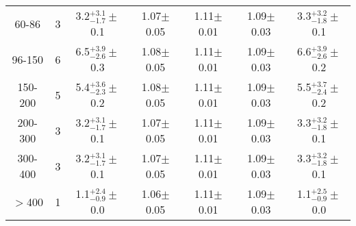 \begin{table}[ht!]
\begin{tabular}{ c  c  c  c  c  c c}
60-86    & 3    & 3.2$^{+3.1}_{-1.7}\pm$0.1  &  1.07$\pm$0.05 & 1.11$\pm$0.01& 1.09$\pm$0.03 & 3.3$^{+3.2}_{-1.8}\pm$0.1 \\
96-150   & 6    & 6.5$^{+3.9}_{-2.6}\pm$0.3  &  1.08$\pm$0.05 & 1.11$\pm$0.01& 1.09$\pm$0.03 & 6.6$^{+3.9}_{-2.6}\pm$0.2 \\
150-200  & 5    & 5.4$^{+3.6}_{-2.3}\pm$0.2  &  1.08$\pm$0.05 & 1.11$\pm$0.01& 1.09$\pm$0.03 & 5.5$^{+3.7}_{-2.4}\pm$0.2 \\
200-300  & 3    & 3.2$^{+3.1}_{-1.7}\pm$0.1  &  1.07$\pm$0.05 & 1.11$\pm$0.01& 1.09$\pm$0.03 & 3.3$^{+3.2}_{-1.8}\pm$0.1 \\
300-400  & 3    & 3.2$^{+3.1}_{-1.7}\pm$0.1  &  1.07$\pm$0.05 & 1.11$\pm$0.01& 1.09$\pm$0.03 & 3.3$^{+3.2}_{-1.8}\pm$0.1 \\
$>$400   & 1    & 1.1$^{+2.4}_{-0.9}\pm$0.0  &  1.06$\pm$0.05 & 1.11$\pm$0.01& 1.09$\pm$0.03 & 1.1$^{+2.5}_{-0.9}\pm$0.0 \\
\hline\hline
\end{tabular}
\end{table}
